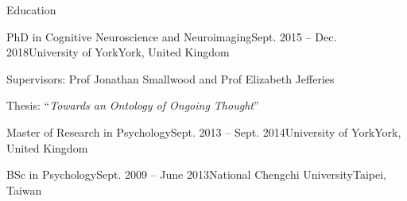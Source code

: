 \documentclass{resume} %
\begin{document}

\begin{rSection}{Education}

  \begin{rSubsection}{PhD in Cognitive Neuroscience and Neuroimaging}{Sept. 2015 -- Dec. 2018}{University of York}{York, United Kingdom}
    \item Supervisors: Prof Jonathan Smallwood and Prof Elizabeth Jefferies
    \item Thesis: ``\textit{Towards an Ontology of Ongoing Thought}''
  \end{rSubsection}

  \begin{EDUrSubsection}{Master of Research in Psychology}{Sept. 2013 -- Sept. 2014}{University of York}{York, United Kingdom}
  \end{EDUrSubsection}

  \begin{EDUrSubsection}{BSc in Psychology}{Sept. 2009 -- June 2013}{National Chengchi University}{Taipei, Taiwan}
  \end{EDUrSubsection}
\end{rSection}

\end{document}

